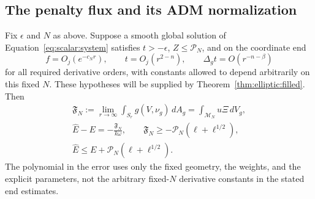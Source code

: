 \subsection{The penalty flux and its ADM normalization}

\begin{proposition}\label{prop:scalar:flux}
Fix $\epsilon$ and $N$ as above.  Suppose a smooth global solution
of Equation~\eqref{eq:scalar:system} satisfies $t>-\epsilon$,
$Z\leq\mathcal P_N$, and on the coordinate end
\[
 f=O_j(e^{-c_Nr}),\qquad t=O_j(r^{2-n}),\qquad
 \Delta_gt=O(r^{-n-\beta})
\]
for all required derivative orders, with constants allowed to depend
arbitrarily on this fixed $N$.  These hypotheses will be supplied by
Theorem~\ref{thm:elliptic:filled}.  Then
\begin{equation}
 \begin{gathered}
 \mathfrak F_N:=\lim_{r\to\infty}
       \int_{S_r}g(V,\nu_g)\,dA_g
       =\int_{\mathcal M_N}u\Xi\,dV_g,\\
 \widehat E-E=-\frac{\mathfrak F_N}{k\omega},\qquad
 \mathfrak F_N\geq-\mathcal P_N(\ell+\ell^{1/2}),\\
 \widehat E\leq E+\mathcal P_N(\ell+\ell^{1/2}).
 \end{gathered}
 \label{eq:scalar:flux-energy}
\end{equation}
The polynomial in the error uses only the fixed geometry, the weights,
and the explicit parameters, not the arbitrary fixed-$N$ derivative
constants in the stated end estimates.
\end{proposition}

